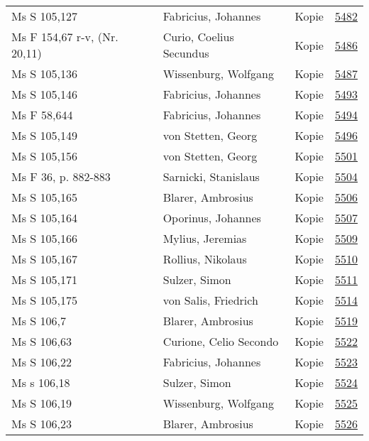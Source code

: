 \documentclass[10pt,a4paper,landscape]{report}
\begin{document}
\begin{longtable}{p{16cm}p{4cm}lr}
Ms S 105,127	&	Fabricius, Johannes	&	Kopie	&	\href{http://130.60.24.72/assignment/5482}{5482}\\
Ms F 154,67 r-v, (Nr. 20,11)	&	Curio, Coelius Secundus	&	Kopie	&	\href{http://130.60.24.72/assignment/5486}{5486}\\
Ms S 105,136	&	Wissenburg, Wolfgang	&	Kopie	&	\href{http://130.60.24.72/assignment/5487}{5487}\\
Ms S 105,146	&	Fabricius, Johannes	&	Kopie	&	\href{http://130.60.24.72/assignment/5493}{5493}\\
Ms F 58,644	&	Fabricius, Johannes	&	Kopie	&	\href{http://130.60.24.72/assignment/5494}{5494}\\
Ms S 105,149	&	von Stetten, Georg	&	Kopie	&	\href{http://130.60.24.72/assignment/5496}{5496}\\
Ms S 105,156	&	von Stetten, Georg	&	Kopie	&	\href{http://130.60.24.72/assignment/5501}{5501}\\
Ms F 36, p. 882-883	&	Sarnicki, Stanislaus	&	Kopie	&	\href{http://130.60.24.72/assignment/5504}{5504}\\
Ms S 105,165	&	Blarer, Ambrosius	&	Kopie	&	\href{http://130.60.24.72/assignment/5506}{5506}\\
Ms S 105,164	&	Oporinus, Johannes	&	Kopie	&	\href{http://130.60.24.72/assignment/5507}{5507}\\
Ms S 105,166	&	Mylius, Jeremias	&	Kopie	&	\href{http://130.60.24.72/assignment/5509}{5509}\\
Ms S 105,167	&	Rollius, Nikolaus	&	Kopie	&	\href{http://130.60.24.72/assignment/5510}{5510}\\
Ms S 105,171	&	Sulzer, Simon	&	Kopie	&	\href{http://130.60.24.72/assignment/5511}{5511}\\
Ms S 105,175	&	von Salis, Friedrich	&	Kopie	&	\href{http://130.60.24.72/assignment/5514}{5514}\\
Ms S 106,7	&	Blarer, Ambrosius	&	Kopie	&	\href{http://130.60.24.72/assignment/5519}{5519}\\
Ms S 106,63	&	Curione, Celio Secondo	&	Kopie	&	\href{http://130.60.24.72/assignment/5522}{5522}\\
Ms S 106,22	&	Fabricius, Johannes	&	Kopie	&	\href{http://130.60.24.72/assignment/5523}{5523}\\
Ms s 106,18	&	Sulzer, Simon	&	Kopie	&	\href{http://130.60.24.72/assignment/5524}{5524}\\
Ms S 106,19	&	Wissenburg, Wolfgang	&	Kopie	&	\href{http://130.60.24.72/assignment/5525}{5525}\\
Ms S 106,23	&	Blarer, Ambrosius	&	Kopie	&	\href{http://130.60.24.72/assignment/5526}{5526}\\

\end{longtable}
\end{document}
